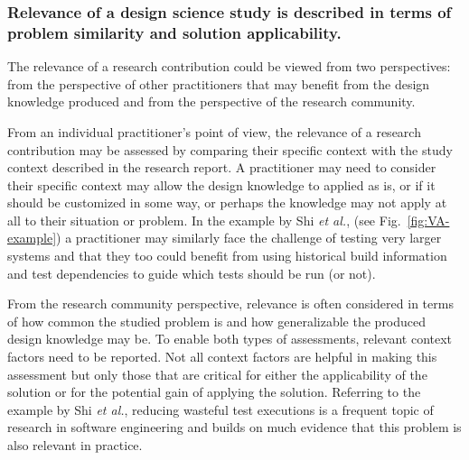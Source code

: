 \documentclass[graybox]{svmult}
\begin{document}
{%

\subsubsection{Relevance of a design science study is described in terms of problem similarity and solution applicability.} 

The relevance of a research contribution could be viewed from two perspectives: from the perspective of other practitioners that may benefit from the design knowledge produced and from the perspective of the research community. 

From an individual practitioner's point of view, the relevance of a research contribution may be assessed by comparing their specific context with the study context described in the research report. 
A practitioner may need to consider their specific context may allow the design knowledge to applied as is, or if it should be customized in some way, or perhaps the knowledge may not apply at all to their situation or problem.
In the example by Shi \emph{et al.}, (see Fig.~\ref{fig:VA-example}) a practitioner may similarly face the challenge of testing very larger systems and  that they too could benefit from using historical build information and test dependencies to guide which tests should be run (or not).

From the research community perspective, relevance is often considered in terms of how common the studied problem is and how generalizable the produced design knowledge may be. To enable both types of assessments, relevant context factors need to be reported. Not all context factors are helpful in making this assessment but only those that are critical for either the applicability of the solution or for the potential gain of applying the solution. 
Referring to the example by Shi \emph{et al.}, reducing wasteful test executions is a frequent topic of research in software engineering and builds on much evidence that this problem is also relevant in practice.

}
\end{document}

